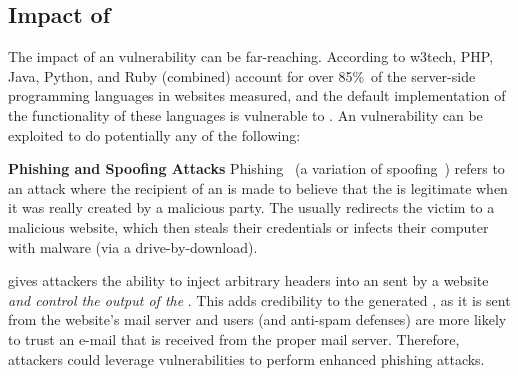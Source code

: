 \subsection{Impact of \ehi}


The impact of an \ehi vulnerability can be far-reaching.
According to w3tech, PHP, Java, Python, and Ruby (combined) account
for over 85\%\, of the server-side programming languages in websites
measured, and the default implementation of the \email functionality
of these languages is vulnerable to \ehi. An \ehi vulnerability can be
exploited to do potentially any of the following:





		

\noindent \textbf{Phishing and Spoofing Attacks}
Phishing~\cite{phishing} (a variation of
spoofing~\cite{spoofing_attack}) refers to an attack where the
recipient of an \email is made to believe that the \email is
legitimate when it was really created by a malicious party. The \email
usually redirects the victim to a malicious website, which then steals
their credentials or infects their computer with malware (via a
drive-by-download).
    
    \ehi gives attackers the ability to inject arbitrary headers into an \email sent by a website \emph{and control the output of the \email}. This adds credibility to the generated \email, as it is sent from the website's mail server and users (and anti-spam defenses) are more likely to trust an e-mail that is received from the proper mail server. Therefore, attackers could leverage \ehi vulnerabilities to perform enhanced phishing attacks. 
	
